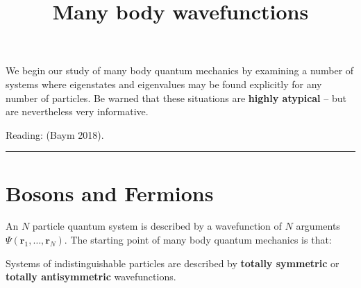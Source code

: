 \documentclass[
  letterpaper,
  DIV=11,
  numbers=noendperiod]{scrreprt}
\title{Many body wavefunctions}
\author{}
\date{}
\begin{document}
\maketitle


\newcommand{\br}{\mathbf{r}}
\newcommand{\bp}{\mathbf{p}}
\newcommand{\bk}{\mathbf{k}}
\newcommand{\bq}{\mathbf{q}}
\newcommand{\bv}{\mathbf{v}}
\newcommand{\pop}{\psi^{\vphantom{\dagger}}}
\newcommand{\pdop}{\psi^\dagger}
\newcommand{\Pop}{\Psi^{\vphantom{\dagger}}}
\newcommand{\Pdop}{\Psi^\dagger}
\newcommand{\Phop}{\Phi^{\vphantom{\dagger}}}
\newcommand{\Phdop}{\Phi^\dagger}
\newcommand{\phop}{\phi^{\vphantom{\dagger}}}
\newcommand{\phdop}{\phi^\dagger}
\newcommand{\aop}{a^{\vphantom{\dagger}}}
\newcommand{\adop}{a^\dagger}
\newcommand{\bop}{b^{\vphantom{\dagger}}}
\newcommand{\bdop}{b^\dagger}
\newcommand{\cop}{c^{\vphantom{\dagger}}}
\newcommand{\cdop}{c^\dagger}
\newcommand{\bra}[1]{\langle{#1}\rvert}
\newcommand{\ket}[1]{\lvert{#1}\rangle}
\newcommand{\inner}[2]{\langle{#1}\rvert #2 \rangle}
\newcommand{\braket}[3]{\langle{#1}\rvert #2 \lvert #3 \rangle}
\newcommand{\sgn}{\mathrm{sgn}}

\DeclareMathOperator{\tr}{tr}
\DeclareMathOperator{\E}{\mathbb{E}}

We begin our study of many body quantum mechanics by examining a number
of systems where eigenstates and eigenvalues may be found explicitly for
any number of particles. Be warned that these situations are
\textbf{highly atypical} -- but are nevertheless very informative.

Reading: (Baym 2018).

\begin{center}\rule{0.5\linewidth}{0.5pt}\end{center}

\chapter{Bosons and Fermions}\label{bosons-and-fermions}

An \(N\) particle quantum system is described by a wavefunction of \(N\)
arguments \(\Psi(\mathbf{r}_1,\ldots, \mathbf{r}_N)\). The starting
point of many body quantum mechanics is that:

\begin{tcolorbox}[enhanced jigsaw, colback=white, bottomrule=.15mm, left=2mm, arc=.35mm, opacityback=0, breakable, colframe=quarto-callout-warning-color-frame, toprule=.15mm, leftrule=.75mm, rightrule=.15mm]

Systems of indistinguishable particles are described by \textbf{totally
symmetric} or \textbf{totally antisymmetric} wavefunctions.

\end{tcolorbox}
\end{document}
